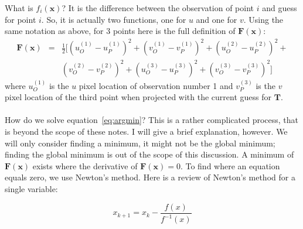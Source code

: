 \documentclass{article}
\begin{document}
What is $f_i(\mathbf{x})$?  It is the difference between the
observation of point $i$ and guess for point $i$.  So, it is actually
two functions, one for $u$ and one for $v$.  Using the same notation
as above, for 3 points here is the full definition of
$\mathbf{F}(\mathbf{x})$:
\begin{eqnarray}
  \label{eq:full-F}
  \mathbf{F}(\mathbf{x}) &=& \frac{1}{2} [ (u_O^{(1)} - u_P^{(1)})^2 + (v_O^{(1)} - v_P^{(1)})^2 + (u_O^{(2)} - u_P^{(2)})^2 + \\
    && (v_O^{(2)} - v_P^{(2)})^2 + (u_O^{(3)} - u_P^{(3)})^2 + (v_O^{(3)} - v_P^{(3)})^2 ] \nonumber
\end{eqnarray}
where $u_O^{(1)}$ is the $u$ pixel location of observation number 1
and $v_P^{(3)}$ is the $v$ pixel location of the third point when
projected with the current guess for $\mathbf{T}$.
\\
\\
How do we solve equation~\ref{eq:argmin}?  This is a rather
complicated process, that is beyond the scope of these notes.  I will
give a brief explanation, however.  We will only consider finding a
minimum, it might not be the global minimum; finding the global
minimum is out of the scope of this discussion.  A minimum of
$\mathbf{F(\mathbf{x})}$ exists where the derivative of
$\mathbf{F(\mathbf{x})} = 0$.  To find where an equation equals zero,
we use Newton's method.  Here is a review of Newton's method for a
single variable:

\begin{equation}
  \label{eq:newton-1d}
  x_{k+1} = x_k - \frac{f(x)}{f^{-1}(x)}
\end{equation}
\end{document}
